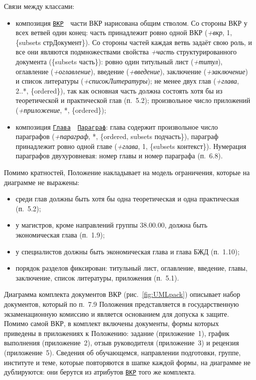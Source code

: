 Связи между классами:
\begin{itemize}
	\item композиция \hyperref[fig:UMLvkr]{\Verb|ВКР|}~~части ВКР нарисована общим стволом. Со стороны ВКР у всех ветвей один конец: часть принадлежит ровно одной ВКР (\textit{+вкр}, 1, \{subsets стрДокумент\}). Со стороны частей каждая ветвь задаёт свою роль, и все они являются подмножествами свойства \textit{+часть} структурированного документа (\{subsets часть\}): ровно один титульный лист (\textit{+титул}), оглавление (\textit{+оглавление}), введение (\textit{+введение}), заключение (\textit{+заключение}) и список литературы (\textit{+списокЛитературы}); не менее двух глав (\textit{+глава}, 2..*, \{ordered\}), так как основная часть должна состоять хотя бы из теоретической и практической глав (п.~5.2); произвольное число приложений (\textit{+приложение}, *, \{ordered\});
	\item композиция \hyperref[fig:UMLvkr]{\Verb|Глава|}~~\hyperref[fig:UMLvkr]{\Verb|Параграф|}: глава содержит произвольное число параграфов (\textit{+параграф}, *, \{ordered, subsets подчасть\}), параграф принадлежит ровно одной главе (\textit{+глава}, 1, \{subsets контекст\}). Нумерация параграфов двухуровневая: номер главы и номер параграфа (п.~6.8).
\end{itemize}

Помимо кратностей, Положение накладывает на модель ограничения, которые на диаграмме не выражены:
\begin{itemize}
	\item среди глав должны быть хотя бы одна теоретическая и одна практическая (п.~5.2);
	\item у магистров, кроме направлений группы 38.00.00, должна быть экономическая глава (п.~1.9);
	\item у специалистов должны быть экономическая глава и глава БЖД (п.~1.10);
	\item порядок разделов фиксирован: титульный лист, оглавление, введение, главы, заключение, список литературы, приложения (п.~5.1).
\end{itemize}

Диаграмма комплекта документов ВКР (рис.~\ref{fig:UMLpack}) описывает набор документов, который по п.~7.9 Положения представляется в государственную экзаменационную комиссию и является основанием для допуска к защите. Помимо самой ВКР, в комплект включены документы, формы которых приведены в приложениях к Положению: задание (приложение~1), график выполнения (приложение~2), отзыв руководителя (приложение~3) и рецензия (приложение~5). Сведения об обучающемся, направлении подготовки, группе, институте и теме, которые повторяются в шапке каждой формы, на диаграмме не дублируются: они берутся из атрибутов \hyperref[fig:UMLvkr]{\Verb|ВКР|} того же комплекта.

